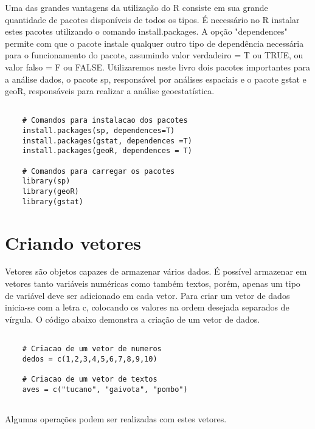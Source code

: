 Uma das grandes vantagens da utilização do R consiste em sua grande quantidade de pacotes disponíveis de todos os tipos. É necessário no R instalar estes pacotes utilizando o comando install.packages. A opção "dependences" permite com que o pacote instale qualquer outro tipo de dependência necessária para o funcionamento do pacote, assumindo valor verdadeiro = T ou TRUE, ou valor falso = F ou FALSE.  Utilizaremos neste livro dois pacotes importantes para a análise dados, o pacote sp, responsável por análises espaciais e o pacote gstat e geoR, responsáveis para realizar a análise geoestatística. 

\begin{scriptsize}
	\estiloR
	\begin{lstlisting}[caption={Código fonte em R para instalação dos pacotes necessários}, label=lst:rcode]
	
	# Comandos para instalacao dos pacotes
	install.packages(sp, dependences=T)
	install.packages(gstat, dependences =T)
	install.packages(geoR, dependences = T)
	
	# Comandos para carregar os pacotes 
	library(sp)
	library(geoR)
	library(gstat)
	\end{lstlisting}
\end{scriptsize}

\section{Criando vetores}

Vetores são objetos capazes de armazenar vários dados. É possível armazenar em vetores tanto variáveis numéricas como também textos, porém, apenas um tipo de variável deve ser adicionado em cada vetor. Para criar um vetor de dados inicia-se com a letra c, colocando os valores na ordem desejada separados de vírgula. O código abaixo demonstra  a criação de um vetor de dados. 

\begin{scriptsize}
	\estiloR
	\begin{lstlisting}[caption={Criação de um vetor em R}, label=lst:rcode]
	
	# Criacao de um vetor de numeros
	dedos = c(1,2,3,4,5,6,7,8,9,10)
	
	# Criacao de um vetor de textos
	aves = c("tucano", "gaivota", "pombo")
	
	\end{lstlisting}
\end{scriptsize}

Algumas operações podem ser realizadas com estes vetores. 

